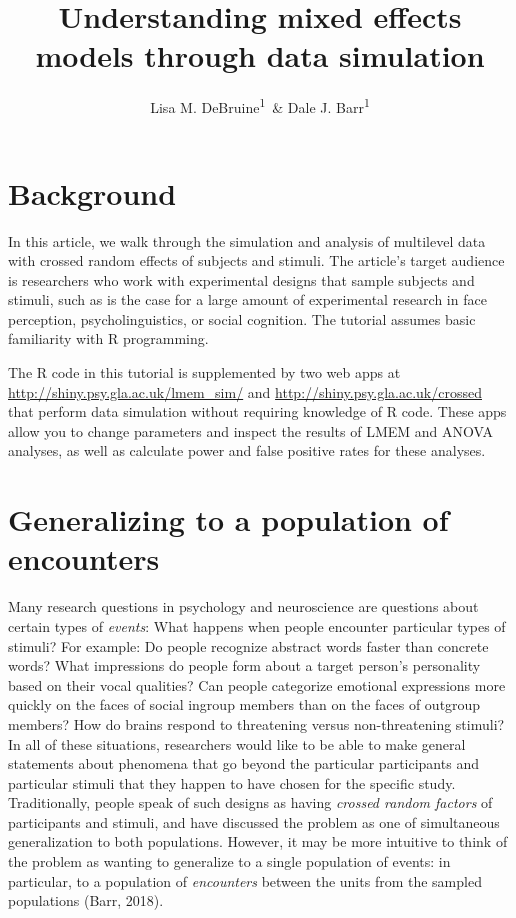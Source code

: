 \documentclass[doc,floatsintext]{apa6}
\title{Understanding mixed effects models through data simulation}
\author{Lisa M. DeBruine\textsuperscript{1}~\& Dale J. Barr\textsuperscript{1}}
\date{}
\affiliation{
\vspace{0.5cm}
\textsuperscript{1} Institute of Neuroscience and Psychology, University of Glasgow}
\begin{document}
\maketitle

\section{Background}\label{background}

In this article, we walk through the simulation and analysis of
multilevel data with crossed random effects of subjects and stimuli. The
article's target audience is researchers who work with experimental
designs that sample subjects and stimuli, such as is the case for a
large amount of experimental research in face perception,
psycholinguistics, or social cognition. The tutorial assumes basic
familiarity with R programming.

The R code in this tutorial is supplemented by two web apps at
\url{http://shiny.psy.gla.ac.uk/lmem_sim/} and
\url{http://shiny.psy.gla.ac.uk/crossed} that perform data simulation
without requiring knowledge of R code. These apps allow you to change
parameters and inspect the results of LMEM and ANOVA analyses, as well
as calculate power and false positive rates for these analyses.

\section{Generalizing to a population of
encounters}\label{generalizing-to-a-population-of-encounters}

Many research questions in psychology and neuroscience are questions
about certain types of \emph{events}: What happens when people encounter
particular types of stimuli? For example: Do people recognize abstract
words faster than concrete words? What impressions do people form about
a target person's personality based on their vocal qualities? Can people
categorize emotional expressions more quickly on the faces of social
ingroup members than on the faces of outgroup members? How do brains
respond to threatening versus non-threatening stimuli? In all of these
situations, researchers would like to be able to make general statements
about phenomena that go beyond the particular participants and
particular stimuli that they happen to have chosen for the specific
study. Traditionally, people speak of such designs as having
\emph{crossed random factors} of participants and stimuli, and have
discussed the problem as one of simultaneous generalization to both
populations. However, it may be more intuitive to think of the problem
as wanting to generalize to a single population of events: in
particular, to a population of \emph{encounters} between the units from
the sampled populations (Barr, 2018).
\end{document}
